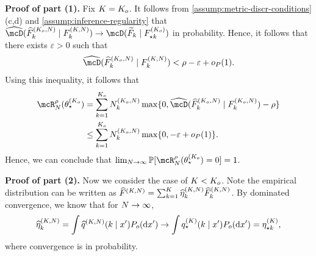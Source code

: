\textbf{Proof of part (1).} %
Fix $K=K_{o}$.
It follows from \cref{assump:metric-discr-conditions}(c,d) and \cref{assump:inference-regularity} that $\discrest{\widehat{F}^{(\numcomps_{o},\numobs)}_{k}}{F^{(\numcomps,\numobs)}_{k} }  \to \discr{\widetilde{F}_{k}}{F^{(\numcomps_{o})}_{\opt k}}$ in probability.
Hence, it follows that there exists $\varepsilon>0$ such that
\[
	\discrest{\widehat{F}^{(\numcomps_{o},\numobs)}_{k}}{F^{(\numcomps,\numobs)}_{k} } < \rho - \varepsilon + \op(1).
\]
Using this inequality, it follows that
\begin{align}
	\mcR^{\rho}_{\numobs}(\allparam^{(\numcomps_o}_{\star})
	 & =\sum_{k=1}^{\numcomps_o}	N^{(\numcomps_{o},\numobs)}_k \max\{0, \discrest{\widehat{F}_{k}^{(\numcomps_o, \numobs)}}{F^{(\numcomps_{o},\numobs)}_{k}}  - \rho\} \\
	 & \le \sum_{k=1}^{\numcomps_o}	N^{(\numcomps_{o},\numobs)}_k\max\{0, -\varepsilon+\op(1)\}.
\end{align}
Hence, we can conclude that $\lim_{\numobs \rightarrow\infty}\Pr[ \mcR^{\rho}_{\numobs}(\allparam^{(\numcomps_o}_{\star}) =0] = 1$. %

\textbf{Proof of part (2).}
Now we consider the case of $K < K_o$.
Note the empirical distribution can be written as $\widehat{F}^{(K, N)} = \sum_{k=1}^{K}\widehat{\eta}_k^{(K, N)} \widehat{F}_k^{(K, N)}$.
By dominated convergence, we know that for $N \to \infty$,
\begin{equation}
	\widehat{\eta}_k^{(\numcomps,\numobs)} = \int \widehat{q}^{(\numcomps,\numobs)} (k\mid x')\datadist(\dee x') \rightarrow  \int q^{(\numcomps)}_{\star}(k\mid x')\datadist(\dee x') = \eta^{(\numcomps)}_{\star k}, \label{eq:pi-conv}
\end{equation}
where convergence is in probability.


